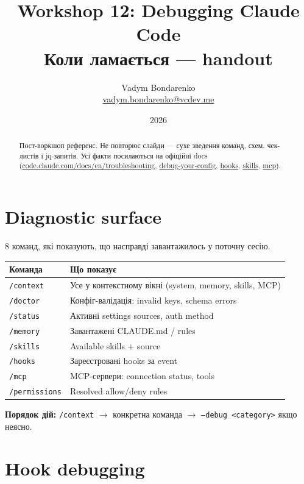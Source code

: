 \documentclass[11pt,a4paper]{article}
\title{%
  {\Huge\bfseries Workshop 12: Debugging Claude Code}\\[0.6em]
  {\large Коли ламається --- handout}
}
\author{Vadym Bondarenko \\ \small\href{mailto:vadym.bondarenko@vcdev.me}{vadym.bondarenko@vcdev.me}}
\date{2026}
\begin{document}
\maketitle

\begin{abstract}
Пост-воркшоп референс. Не повторює слайди --- сухе зведення команд, схем, чек-листів і jq-запитів. Усі факти посилаються на офіційні docs (\href{https://code.claude.com/docs/en/troubleshooting}{code.claude.com/docs/en/troubleshooting}, \href{https://code.claude.com/docs/en/debug-your-config}{debug-your-config}, \href{https://code.claude.com/docs/en/hooks}{hooks}, \href{https://code.claude.com/docs/en/skills}{skills}, \href{https://code.claude.com/docs/en/mcp}{mcp}).
\end{abstract}

\tableofcontents
\newpage

\section{Diagnostic surface}

8 команд, які показують, що насправді завантажилось у поточну сесію.

\begin{tabular}{ll}
\hline
\textbf{Команда} & \textbf{Що показує} \\
\hline
\texttt{/context} & Усе у контекстному вікні (system, memory, skills, MCP) \\
\texttt{/doctor} & Конфіг-валідація: invalid keys, schema errors \\
\texttt{/status} & Активні settings sources, auth method \\
\texttt{/memory} & Завантажені CLAUDE.md / rules \\
\texttt{/skills} & Available skills + source \\
\texttt{/hooks} & Зареєстровані hooks за event \\
\texttt{/mcp} & MCP-сервери: connection status, tools \\
\texttt{/permissions} & Resolved allow/deny rules \\
\hline
\end{tabular}

\textbf{Порядок дій:} \texttt{/context} $\to$ конкретна команда $\to$ \texttt{--debug <category>} якщо неясно.

\section{Hook debugging}
\end{document}
